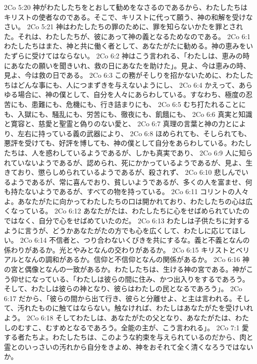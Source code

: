 2Co 5:20  神がわたしたちをとおして勧めをなさるのであるから、わたしたちはキリストの使者なのである。そこで、キリストに代って願う、神の和解を受けなさい。
2Co 5:21  神はわたしたちの罪のために、罪を知らないかたを罪とされた。それは、わたしたちが、彼にあって神の義となるためなのである。
2Co 6:1  わたしたちはまた、神と共に働く者として、あなたがたに勧める。神の恵みをいたずらに受けてはならない。
2Co 6:2  神はこう言われる、「わたしは、恵みの時にあなたの願いを聞きいれ、救の日にあなたを助けた」。見よ、今は恵みの時、見よ、今は救の日である。
2Co 6:3  この務がそしりを招かないために、わたしたちはどんな事にも、人につまずきを与えないようにし、
2Co 6:4  かえって、あらゆる場合に、神の僕として、自分を人々にあらわしている。すなわち、極度の忍苦にも、患難にも、危機にも、行き詰まりにも、
2Co 6:5  むち打たれることにも、入獄にも、騒乱にも、労苦にも、徹夜にも、飢餓にも、
2Co 6:6  真実と知識と寛容と、慈愛と聖霊と偽りのない愛と、
2Co 6:7  真理の言葉と神の力とにより、左右に持っている義の武器により、
2Co 6:8  ほめられても、そしられても、悪評を受けても、好評を博しても、神の僕として自分をあらわしている。わたしたちは、人を惑わしているようであるが、しかも真実であり、
2Co 6:9  人に知られていないようであるが、認められ、死にかかっているようであるが、見よ、生きており、懲らしめられているようであるが、殺されず、
2Co 6:10  悲しんでいるようであるが、常に喜んでおり、貧しいようであるが、多くの人を富ませ、何も持たないようであるが、すべての物を持っている。
2Co 6:11  コリントの人々よ。あなたがたに向かってわたしたちの口は開かれており、わたしたちの心は広くなっている。
2Co 6:12  あなたがたは、わたしたちに心をせばめられていたのではなく、自分で心をせばめていたのだ。
2Co 6:13  わたしは子供たちに対するように言うが、どうかあなたがたの方でも心を広くして、わたしに応じてほしい。
2Co 6:14  不信者と、つり合わないくびきを共にするな。義と不義となんの係わりがあるか。光とやみとなんの交わりがあるか。
2Co 6:15  キリストとベリアルとなんの調和があるか。信仰と不信仰となんの関係があるか。
2Co 6:16  神の宮と偶像となんの一致があるか。わたしたちは、生ける神の宮である。神がこう仰せになっている、「わたしは彼らの間に住み、かつ出入りをするであろう。そして、わたしは彼らの神となり、彼らはわたしの民となるであろう」。
2Co 6:17  だから、「彼らの間から出て行き、彼らと分離せよ、と主は言われる。そして、汚れたものに触てはならない。触なければ、わたしはあなたがたを受けいれよう。
2Co 6:18  そしてわたしは、あなたがたの父となり、あなたがたは、わたしのむすこ、むすめとなるであろう。全能の主が、こう言われる」。
2Co 7:1  愛する者たちよ。わたしたちは、このような約束を与えられているのだから、肉と霊とのいっさいの汚れから自分をきよめ、神をおそれて全く清くなろうではないか。
